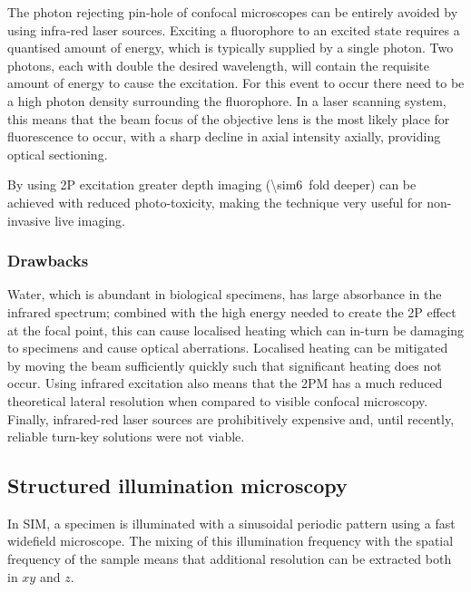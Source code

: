 The photon rejecting pin-hole of confocal microscopes can be entirely avoided by using infra-red laser sources.
Exciting a fluorophore to an excited state requires a quantised amount of energy, which is typically supplied by a single photon.
Two photons, each with double the desired wavelength, will contain the requisite amount of energy to cause the excitation.
For this event to occur there need to be a high photon density surrounding the fluorophore.
In a laser scanning system, this means that the beam focus of the objective lens is the most likely place for fluorescence to occur, with a sharp decline in axial intensity axially, providing optical sectioning.

By using 2P excitation greater depth imaging (\SI{\sim6}{fold} deeper) can be achieved with reduced photo-toxicity, making the technique very useful for non-invasive live imaging.

\subsubsection{Drawbacks}

Water, which is abundant in biological specimens, has large absorbance in the infrared spectrum; combined with the high energy needed to create the 2P effect at the focal point, this can cause localised heating which can in-turn be damaging to specimens and cause optical aberrations.
Localised heating can be mitigated by moving the beam sufficiently quickly such that significant heating does not occur.
Using infrared excitation also means that the 2PM has a much reduced theoretical lateral resolution when compared to visible confocal microscopy.
Finally, infrared-red laser sources are prohibitively expensive and, until recently, reliable turn-key solutions were not viable.

\subsection{Structured illumination microscopy}

In SIM, a specimen is illuminated with a sinusoidal periodic pattern using a fast widefield microscope.
The mixing of this illumination frequency with the spatial frequency of the sample means that additional resolution can be extracted both in $xy$ and $z$.

